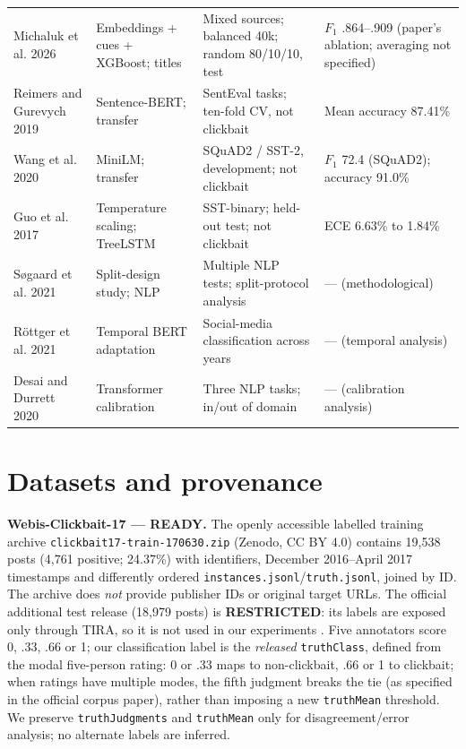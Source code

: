 \documentclass[11pt]{article}
\begin{document}
\begin{table}[t]
\begin{tabularx}{\textwidth}{@{}p{2.10cm}p{3.10cm}X p{2.25cm}@{}}
Michaluk et al. 2026 & Embeddings + cues + XGBoost; titles & Mixed sources; balanced 40k; random 80/10/10, test & $F_1$ .864--.909 (paper's ablation; averaging not specified)\\
Reimers and Gurevych 2019 & Sentence-BERT; transfer & SentEval tasks; ten-fold CV, not clickbait & Mean accuracy 87.41\%\\
Wang et al. 2020 & MiniLM; transfer & SQuAD2 / SST-2, development; not clickbait & $F_1$ 72.4 (SQuAD2); accuracy 91.0\%\\
Guo et al. 2017 & Temperature scaling; TreeLSTM & SST-binary; held-out test; not clickbait & ECE 6.63\% to 1.84\%\\
S\o gaard et al. 2021 & Split-design study; NLP & Multiple NLP tests; split-protocol analysis & --- (methodological)\\
R\"ottger et al. 2021 & Temporal BERT adaptation & Social-media classification across years & --- (temporal analysis)\\
Desai and Durrett 2020 & Transformer calibration & Three NLP tasks; in/out of domain & --- (calibration analysis)\\
\bottomrule
\end{tabularx}
\end{table}

\section{Datasets and provenance}
\textbf{Webis-Clickbait-17 --- READY.} The openly accessible labelled training archive \texttt{clickbait17-train-170630.zip} (Zenodo, CC BY 4.0) contains 19,538 posts (4,761 positive; 24.37\%) with identifiers, December 2016--April 2017 timestamps and differently ordered \texttt{instances.jsonl}/\texttt{truth.jsonl}, joined by ID. The archive does \emph{not} provide publisher IDs or original target URLs. The official additional test release (18,979 posts) is \textbf{RESTRICTED}: its labels are exposed only through TIRA, so it is not used in our experiments \cite{potthast2018,potthast2018challenge}. Five annotators score 0, .33, .66 or 1; our classification label is the \emph{released} \texttt{truthClass}, defined from the modal five-person rating: 0 or .33 maps to non-clickbait, .66 or 1 to clickbait; when ratings have multiple modes, the fifth judgment breaks the tie (as specified in the official corpus paper), rather than imposing a new \texttt{truthMean} threshold. We preserve \texttt{truthJudgments} and \texttt{truthMean} only for disagreement/error analysis; no alternate labels are inferred.
\end{document}
